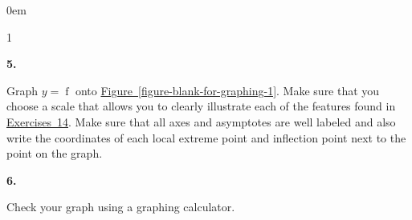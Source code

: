 \documentclass[12pt,]{book}
\theoremstyle{plain}
\theoremstyle{definition}
\numberwithin{equation}{section}
\newcounter{figstack}
\newcounter{figindex}
\newlength\fight
\newcommand\pushValignCaptionBottom[5][b]{%
\stepcounter{figstack}%
\expandafter\def\csname %
figalign\romannumeral\value{figstack}\endcsname{#1}%
\expandafter\def\csname %
figtype\romannumeral\value{figstack}\endcsname{#2}%
\expandafter\def\csname %
figwd\romannumeral\value{figstack}\endcsname{#3}%
\expandafter\def\csname %
figcontent\romannumeral\value{figstack}\endcsname{#4}%
\expandafter\def\csname %
figcap\romannumeral\value{figstack}\endcsname{#5}%
\setbox0=\hbox{%
\begin{#2}{#3}#4\end{#2}}%
\ifdim\dimexpr\ht0+\dp0\relax>\fight\global\setlength{\fight}{%
\dimexpr\ht0+\dp0\relax}\fi%
}
\newcommand\popValignCaptionBottom{%
\setcounter{figindex}{0}%
\hfill%
\whiledo{\value{figindex}<\value{figstack}}{%
\stepcounter{figindex}%
\def\tmp{\csname figwd\romannumeral\value{figindex}\endcsname}%
\begin{\csname figtype\romannumeral\value{figindex}\endcsname}[t]{\tmp}%
\centering%
\stackinset{c}{}%
{\csname figalign\romannumeral\value{figindex}\endcsname}{}%
{\csname figcontent\romannumeral\value{figindex}\endcsname}%
{\rule{0pt}{\fight}}\par%
\csname figcap\romannumeral\value{figindex}\endcsname%
\end{\csname figtype\romannumeral\value{figindex}\endcsname}%
\hfill%
}%
\setcounter{figstack}{0}%
\setlength{\fight}{0pt}%
\hfill%
}
\newenvironment{exercisegroup}%
{\medskip\noindent}%
{\par\bigskip}%
\newlength{\exercisegroupindent}%
\newlength{\exercisegroupitemwidth}%
\newenvironment{exercisegrouplist}%
{\vspace{-\partopsep}%
\begin{adjustwidth}{\exercisegroupindent}{0em}}%
{\end{adjustwidth}%
\vspace{-\partopsep}%
\vspace{\baselineskip}}%
\newenvironment{exercisegroupbycol}[1]%
{\begin{exercisegrouplist}%
\vspace{-\multicolsep}%
\begin{multicols}{#1}%
\setlength{\parindent}{0em}%
\setlength{\exercisegroupitemwidth}{\linewidth}}%
{\end{multicols}%
\vspace{-\multicolsep}%
\end{exercisegrouplist}}%
\newenvironment{exercisegroupitem}[1]%
{\begin{minipage}[t]{\exercisegroupitemwidth}
\vspace{0pt}%
{\bfseries#1}%
\rule{0pt}{\baselineskip}}{\strut%
\end{minipage}%
\hspace{\columnsep}}%
\providecommand\phantomsection{}
\newcommand{\fe}[2]{\mathop{{#1}{\left(#2\right)}}}
\begin{document}
\begin{exercisegroup}
\begin{exercisegroupbycol}{1}
\begin{exercisegroupitem}{5. }
Graph \(y=\fe{f}{x}\) onto \hyperref[figure-blank-for-graphing-1]{Figure~\ref*{figure-blank-for-graphing-1}}. Make sure that you choose a scale that allows you to clearly illustrate each of the features found in \hyperref[exercise-sketch-first-asymptotes]{Exercises~1}\textendash{}\hyperref[exercise-sketch-first-critical-numbers]{4}.  Make sure that all axes and asymptotes are well labeled and also write the coordinates of each local extreme point and inflection point next to the point on the graph.%
\end{exercisegroupitem}%
\par%
\begin{exercisegroupitem}{6. }\phantomsection\hypertarget{exercise-63}{\null}
Check your graph using a graphing calculator.%
\end{exercisegroupitem}%
\par%
\end{exercisegroupbycol}%
\end{exercisegroup}%
\end{document}
